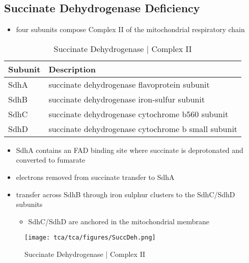 \documentclass{scrartcl}
\begin{document}
\subsection{Succinate Dehydrogenase Deficiency}
\label{sec:orgf3af45c}
\begin{itemize}
\item four subunits compose Complex II of the mitochondrial respiratory chain
\end{itemize}

\begin{table}[htbp]
\caption{\label{tab:org26a8041}Succinate Dehydrogenase | Complex II}
\centering
\begin{tabular}{ll}
Subunit & Description\\
\hline
SdhA & succinate dehydrogenase flavoprotein subunit\\
SdhB & succinate dehydrogenase iron-sulfur subunit\\
SdhC & succinate dehydrogenase cytochrome b560 subunit\\
SdhD & succinate dehydrogenase cytochrome b small subunit\\
\end{tabular}
\end{table}

\begin{itemize}
\item SdhA contains an FAD binding site where succinate is deprotonated
and converted to fumarate
\end{itemize}


\begin{itemize}
\item electrons removed from succinate transfer to SdhA
\item transfer across SdhB through iron sulphur clusters to the SdhC/SdhD subunits
\begin{itemize}
\item SdhC/SdhD are anchored in the mitochondrial membrane
\end{itemize}
\end{itemize}

\begin{figure}[htbp]
\centering
\texttt{[image: tca/tca/figures/SuccDeh.png]}
\caption{\label{fig:orgbedb39e}Succinate Dehydrogenase | Complex II}
\end{figure}
\end{document}
